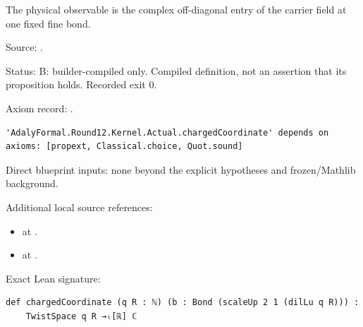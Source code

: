 \begin{definition}[bp-221]
\label{bp-221}
\uses{}
\leanok
The physical observable is the complex off-diagonal entry of the carrier field at one fixed fine bond.

\par Source: \texttt{}.
\par Status: B: builder-compiled only. Compiled definition, not an assertion that its proposition holds. Recorded exit 0.
\par Axiom record: \texttt{}.
\begin{verbatim}
'AdalyFormal.Round12.Kernel.Actual.chargedCoordinate' depends on axioms: [propext, Classical.choice, Quot.sound]
\end{verbatim}
\par Direct blueprint inputs: none beyond the explicit hypotheses and frozen/Mathlib background.
\par Additional local source references:
\begin{itemize}
\item \texttt{} at \texttt{}.
\item \texttt{} at \texttt{}.
\end{itemize}
\par Exact Lean signature:
\begin{verbatim}
def chargedCoordinate (q R : ℕ) (b : Bond (scaleUp 2 1 (dilLu q R))) :
    TwistSpace q R →ₗ[ℝ] ℂ
\end{verbatim}
\end{definition}


